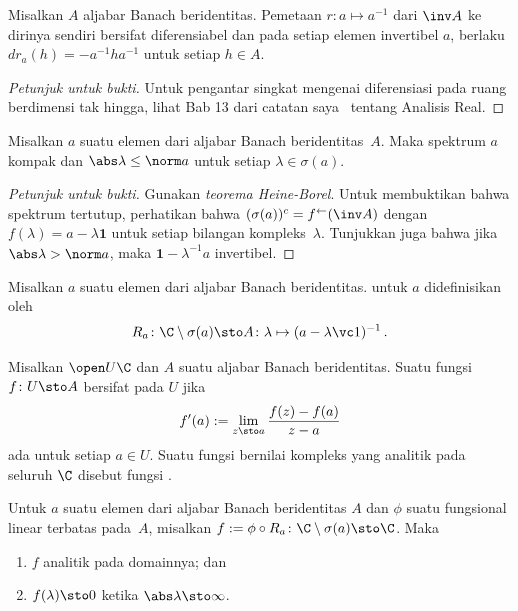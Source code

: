 \begin{prop} Misalkan $A$ aljabar Banach beridentitas. Pemetaan $r\colon a \mapsto a^{-1}$ dari
$\inv A$ ke dirinya sendiri bersifat diferensiabel dan pada setiap elemen invertibel $a$, berlaku
$dr_a(h) = -a^{-1}ha^{-1}$ untuk setiap $h \in A$.
\end{prop}

\begin{proof}[\emph{Petunjuk untuk bukti}] Untuk pengantar singkat mengenai diferensiasi pada ruang
berdimensi tak hingga, lihat Bab 13 dari catatan saya~\cite{Erdman:2007} tentang Analisis Real.  \ns
\end{proof}

\begin{prop}\label{000661} Misalkan $a$ suatu elemen dari aljabar Banach beridentitas~$A$. Maka spektrum $a$
kompak dan $\abs\lambda \le \norm a$ untuk setiap $\lambda \in \sigma(a)$.
\end{prop}

\begin{proof}[\emph{Petunjuk untuk bukti}] Gunakan \emph{teorema Heine-Borel}. Untuk membuktikan bahwa
spektrum tertutup, perhatikan bahwa $(\sigma(a))^c = f^\gets(\inv A)$ dengan $f(\lambda) = a -
\lambda\mathbf 1$ untuk setiap bilangan kompleks~$\lambda$. Tunjukkan juga bahwa jika $\abs\lambda >
\norm a$, maka $\mathbf 1 - \lambda^{-1}a$ invertibel.  \ns
\end{proof}

\begin{defn} Misalkan $a$ suatu elemen dari aljabar Banach beridentitas.
 untuk $a$ didefinisikan oleh
   \[ R_a \colon \C \setminus \sigma(a) \sto A
                 \colon \lambda \mapsto (a  - \lambda\vc 1)^{-1}\,. \]
\end{defn}

\begin{defn} Misalkan $\open U\C$ dan $A$ suatu aljabar Banach beridentitas. Suatu fungsi $f \colon U \sto A$
bersifat  pada $U$ jika
   \[ f'(a) := \lim_{z \sto a} \frac{f(z) - f(a)}{z - a} \]
ada untuk setiap $a \in U$. Suatu fungsi bernilai kompleks yang analitik pada seluruh $\C$
disebut fungsi
.
\end{defn}

\begin{prop} Untuk $a$ suatu elemen dari aljabar Banach beridentitas $A$ dan $\phi$ suatu fungsional linear
terbatas pada~$A$, misalkan $f := \phi \circ R_a \colon \C \setminus \sigma(a) \sto \C$. Maka
 \begin{enumerate}[label=\rm{(\alph*)}]
  \item $f$ analitik pada domainnya; dan
  \item $f(\lambda) \sto 0$ ketika $\abs\lambda \sto \infty$.
 \end{enumerate}
\end{prop}

